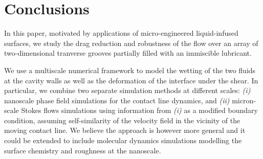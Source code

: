 



\section{Conclusions}

In this paper, motivated by applications of micro-engineered liquid-infused surfaces, we study the drag reduction and robustness of the flow over an array of two-dimensional tranverse grooves partially filled with an immiscible lubricant.

We use a multiscale numerical framework to model the wetting of the two fluids at the cavity walls as well as the deformation of the interface under the shear. In particular, we combine two separate simulation methods at different scales: \textit{(i)} nanoscale phase field simulations for the contact line dynamics, and \textit{(ii)} micron-scale Stokes flows simulations using information from \textit{(i)} as a modified boundary condition, assuming self-similarity of the velocity field in the vicinity of the moving contact line. We believe the approach is however more general and it could be extended to include molecular dynamics simulations modelling the surface chemistry and roughness at the nanoscale.

